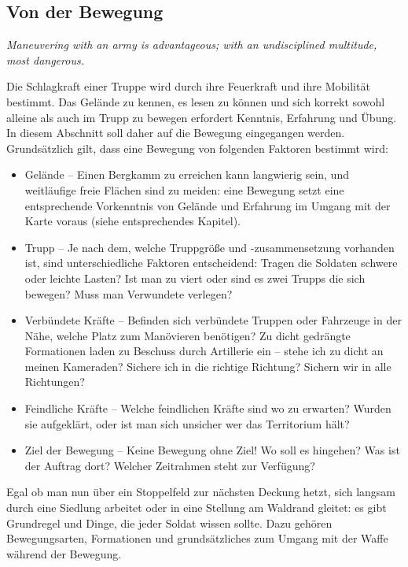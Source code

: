 \newpage
\subsection{Von der Bewegung}

\centerline{\textit{Maneuvering with an army is advantageous; with an undisciplined multitude, most dangerous.}}


Die Schlagkraft einer Truppe wird durch ihre Feuerkraft und ihre Mobilität bestimmt. Das Gelände zu kennen, es lesen zu können und sich korrekt sowohl alleine als auch im Trupp zu bewegen erfordert Kenntnis, Erfahrung und Übung. In diesem Abschnitt soll daher auf die Bewegung eingegangen werden.
\\ 

Grundsätzlich gilt, dass eine Bewegung von folgenden Faktoren bestimmt wird:
	\begin{itemize}
		\item Gelände -- Einen Bergkamm zu erreichen kann langwierig sein, und weitläufige freie Flächen sind zu meiden: eine Bewegung setzt eine 	entsprechende Vorkenntnis von Gelände und Erfahrung im Umgang mit der Karte voraus (siehe entsprechendes Kapitel).
		\item Trupp -- Je nach dem, welche Truppgröße und -zusammensetzung vorhanden ist, sind unterschiedliche Faktoren entscheidend: Tragen die Soldaten schwere oder leichte Lasten? Ist man zu viert oder sind es zwei Trupps die sich bewegen? Muss man Verwundete verlegen? 
		\item Verbündete Kräfte -- Befinden sich verbündete Truppen oder Fahrzeuge in der Nähe, welche Platz zum Manövieren benötigen? Zu dicht gedrängte Formationen laden zu Beschuss durch Artillerie ein -- stehe ich zu dicht an meinen Kameraden? Sichere ich in die richtige Richtung? Sichern wir in alle Richtungen?
		\item Feindliche Kräfte -- Welche feindlichen Kräfte sind wo zu erwarten? Wurden sie aufgeklärt, oder ist man sich unsicher wer das Territorium hält?
		\item Ziel der Bewegung -- Keine Bewegung ohne Ziel! Wo soll es hingehen? Was ist der Auftrag dort? Welcher Zeitrahmen steht zur Verfügung?
	\end{itemize}
Egal ob man nun über ein Stoppelfeld zur nächsten Deckung hetzt, sich langsam durch eine Siedlung arbeitet oder in eine Stellung am Waldrand gleitet: es gibt Grundregel und Dinge, die jeder Soldat wissen sollte. Dazu gehören Bewegungsarten, Formationen und grundsätzliches zum Umgang mit der Waffe während der Bewegung.

